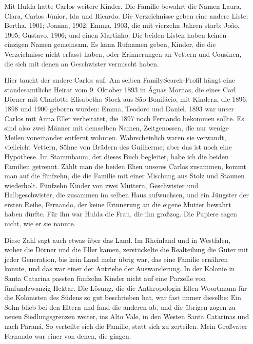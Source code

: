 \documentclass[
  ngerman,
  11pt,
  openany]{book}
\begin{document}
Mit Hulda hatte Carlos weitere Kinder. Die Familie bewahrt die Namen
Laura, Clara, Carlos Júnior, Ida und Ricardo. Die Verzeichnisse geben
eine andere Liste: Bertha, 1901; Joanna, 1902; Emma, 1903, die mit
vierzehn Jahren starb; João, 1905; Gustavo, 1906; und einen Martinho.
Die beiden Listen haben keinen einzigen Namen gemeinsam. Es kann
Rufnamen geben, Kinder, die die Verzeichnisse nicht erfasst haben, oder
Erinnerungen an Vettern und Cousinen, die sich mit denen an Geschwister
vermischt haben.

Hier taucht der andere Carlos auf. Am selben FamilySearch-Profil hängt
eine standesamtliche Heirat vom 9. Oktober 1893 in Águas Mornas, die
eines Carl Dörner mit Charlotte Elisabetha Stock aus São Bonifácio, mit
Kindern, die 1896, 1898 und 1900 geboren wurden: Emma, Teodoro und
Daniel. 1893 war unser Carlos mit Anna Eller verheiratet, die 1897 noch
Fernando bekommen sollte. Es sind also zwei Männer mit demselben Namen,
Zeitgenossen, die nur wenige Meilen voneinander entfernt wohnten.
Wahrscheinlich waren sie verwandt, vielleicht Vettern, Söhne von Brüdern
des Guilherme; aber das ist noch eine Hypothese. Im Stammbaum, der
dieses Buch begleitet, habe ich die beiden Familien getrennt. Zählt man
die beiden Ehen unseres Carlos zusammen, kommt man auf die fünfzehn, die
die Familie mit einer Mischung aus Stolz und Staunen wiederholt.
Fünfzehn Kinder von zwei Müttern, Geschwister und Halbgeschwister, die
zusammen im selben Haus aufwuchsen, und ein Jüngster der ersten Reihe,
Fernando, der keine Erinnerung an die eigene Mutter bewahrt haben
dürfte. Für ihn war Hulda die Frau, die ihn großzog. Die Papiere sagen
nicht, wie er sie nannte.

Diese Zahl sagt auch etwas über das Land. Im Rheinland und in Westfalen,
woher die Dörner und die Eller kamen, zerstückelte die Realteilung die
Güter mit jeder Generation, bis kein Land mehr übrig war, das eine
Familie ernähren konnte, und das war einer der Antriebe der
Auswanderung. In der Kolonie in Santa Catarina passten fünfzehn Kinder
nicht auf eine Parzelle von fünfundzwanzig Hektar. Die Lösung, die die
Anthropologin Ellen Woortmann für die Kolonisten des Südens so gut
beschrieben hat, war fast immer dieselbe: Ein Sohn blieb bei den Eltern
und fand die anderen ab, und die übrigen zogen zu neuen Siedlungsgrenzen
weiter, ins Alto Vale, in den Westen Santa Catarinas und nach Paraná. So
verteilte sich die Familie, statt sich zu zerteilen. Mein Großvater
Fernando war einer von denen, die gingen.
\end{document}
